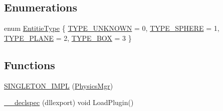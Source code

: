 \subsection*{Enumerations}
\begin{DoxyCompactItemize}
\item 
enum \hyperlink{namespace_agmd_physics_ad084e24011be0a7009fedc9ed9ee92ed}{Entitie\+Type} \{ \hyperlink{namespace_agmd_physics_ad084e24011be0a7009fedc9ed9ee92eda24f365a28f13003b40961f83cb95c93b}{T\+Y\+P\+E\+\_\+\+U\+N\+K\+N\+O\+W\+N} = 0, 
\hyperlink{namespace_agmd_physics_ad084e24011be0a7009fedc9ed9ee92eda05650da4e3a8c895f18fe4f3e7ffd21a}{T\+Y\+P\+E\+\_\+\+S\+P\+H\+E\+R\+E} = 1, 
\hyperlink{namespace_agmd_physics_ad084e24011be0a7009fedc9ed9ee92eda060678b5cbc5d878975e75058b7c9747}{T\+Y\+P\+E\+\_\+\+P\+L\+A\+N\+E} = 2, 
\hyperlink{namespace_agmd_physics_ad084e24011be0a7009fedc9ed9ee92eda303f0aae49b83f0696331cce49157320}{T\+Y\+P\+E\+\_\+\+B\+O\+X} = 3
 \}
\end{DoxyCompactItemize}
\subsection*{Functions}
\begin{DoxyCompactItemize}
\item 
\hyperlink{namespace_agmd_physics_a310c5418f2ad02d3dde01301df034b91}{S\+I\+N\+G\+L\+E\+T\+O\+N\+\_\+\+I\+M\+P\+L} (\hyperlink{class_agmd_physics_1_1_physics_mgr}{Physics\+Mgr})
\item 
\hyperlink{namespace_agmd_physics_aa408461295a9f6a2f3e68674fce76f5c}{\+\_\+\+\_\+declspec} (dllexport) void Load\+Plugin()
\end{DoxyCompactItemize}


